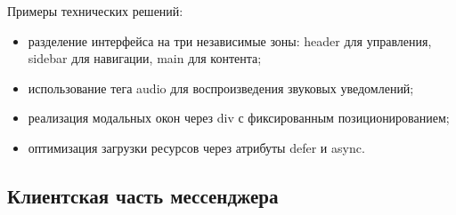 Примеры технических решений:  
\begin{itemize}
	\item разделение интерфейса на три независимые зоны: header для управления, sidebar для навигации, main для контента;
	\item использование тега audio для воспроизведения звуковых уведомлений;
	\item реализация модальных окон через div с фиксированным позиционированием;
	\item оптимизация загрузки ресурсов через атрибуты defer и async.
\end{itemize}



\subsection{Клиентская часть мессенджера}

